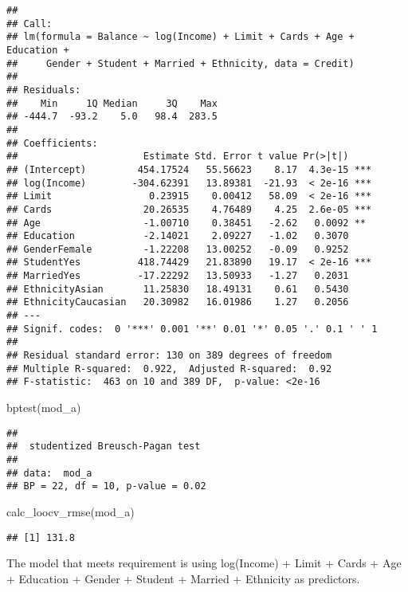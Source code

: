 \documentclass[
]{article}
\newenvironment{Shaded}{\begin{snugshade}}{\end{snugshade}}
\newcommand{\FunctionTok}[1]{\textcolor[rgb]{0.00,0.00,0.00}{#1}}
\newcommand{\NormalTok}[1]{#1}
\begin{document}
\begin{verbatim}
## 
## Call:
## lm(formula = Balance ~ log(Income) + Limit + Cards + Age + Education + 
##     Gender + Student + Married + Ethnicity, data = Credit)
## 
## Residuals:
##    Min     1Q Median     3Q    Max 
## -444.7  -93.2    5.0   98.4  283.5 
## 
## Coefficients:
##                      Estimate Std. Error t value Pr(>|t|)    
## (Intercept)         454.17524   55.56623    8.17  4.3e-15 ***
## log(Income)        -304.62391   13.89381  -21.93  < 2e-16 ***
## Limit                 0.23915    0.00412   58.09  < 2e-16 ***
## Cards                20.26535    4.76489    4.25  2.6e-05 ***
## Age                  -1.00710    0.38451   -2.62   0.0092 ** 
## Education            -2.14021    2.09227   -1.02   0.3070    
## GenderFemale         -1.22208   13.00252   -0.09   0.9252    
## StudentYes          418.74429   21.83890   19.17  < 2e-16 ***
## MarriedYes          -17.22292   13.50933   -1.27   0.2031    
## EthnicityAsian       11.25830   18.49131    0.61   0.5430    
## EthnicityCaucasian   20.30982   16.01986    1.27   0.2056    
## ---
## Signif. codes:  0 '***' 0.001 '**' 0.01 '*' 0.05 '.' 0.1 ' ' 1
## 
## Residual standard error: 130 on 389 degrees of freedom
## Multiple R-squared:  0.922,  Adjusted R-squared:  0.92 
## F-statistic:  463 on 10 and 389 DF,  p-value: <2e-16
\end{verbatim}

\begin{Shaded}
\begin{Highlighting}[]
\FunctionTok{bptest}\NormalTok{(mod\_a)}
\end{Highlighting}
\end{Shaded}

\begin{verbatim}
## 
##  studentized Breusch-Pagan test
## 
## data:  mod_a
## BP = 22, df = 10, p-value = 0.02
\end{verbatim}

\begin{Shaded}
\begin{Highlighting}[]
\FunctionTok{calc\_loocv\_rmse}\NormalTok{(mod\_a)}
\end{Highlighting}
\end{Shaded}

\begin{verbatim}
## [1] 131.8
\end{verbatim}

The model that meets requirement is using log(Income) + Limit + Cards +
Age + Education + Gender + Student + Married + Ethnicity as predictors.
\end{document}
